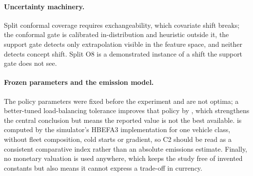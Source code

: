 \paragraph{Uncertainty machinery.} Split conformal coverage requires
exchangeability, which covariate shift breaks; the conformal gate is calibrated
in-distribution and heuristic outside it, the support gate detects only
extrapolation visible in the feature space, and neither detects concept shift.
Split O8 is a demonstrated instance of a shift the support gate does not see.

\paragraph{Frozen parameters and the emission model.} The policy parameters were
fixed before the experiment and are not optima; a better-tuned load-balancing
tolerance improves that policy by \NumEpsGainPct{}, which strengthens the
central conclusion but means the reported value is not the best available.
\CO{} is computed by the simulator's HBEFA3 implementation for one vehicle
class, without fleet composition, cold starts or gradient, so C2 should be read
as a consistent comparative index rather than an absolute emissions estimate.
Finally, no monetary valuation is used anywhere, which keeps the study free of
invented constants but also means it cannot express a trade-off in currency.
